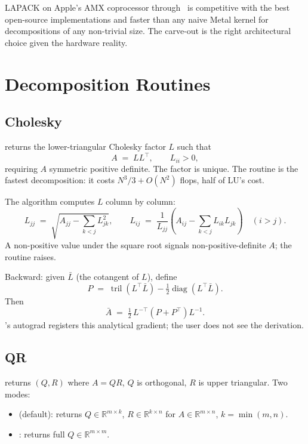 LAPACK on Apple's AMX coprocessor through \Accelerate\ is
competitive with the best open-source implementations and faster
than any naive Metal kernel for decompositions of any non-trivial
size. The carve-out is the right architectural choice given the
hardware reality.

\section{Decomposition Routines}
\label{sec:linalg:decompositions}

\subsection{Cholesky}
\label{ssec:linalg:cholesky}

 returns the lower-triangular Cholesky factor
$L$ such that
\[
A \;=\; L L^\top, \qquad L_{ii} > 0,
\]
requiring $A$ symmetric positive definite. The factor is unique.
The routine is the fastest decomposition: it costs
$N^3/3 + O(N^2)$ flops, half of LU's cost.

The algorithm computes $L$ column by column:
\[
L_{jj} \;=\; \sqrt{A_{jj} - \sum_{k<j} L_{jk}^2},
\qquad
L_{ij} \;=\; \frac{1}{L_{jj}}\!\left(A_{ij} - \sum_{k<j} L_{ik} L_{jk}\right)
\quad (i > j).
\]
A non-positive value under the square root signals
non-positive-definite $A$; the routine raises.

Backward: given $\bar L$ (the cotangent of $L$), define
\[
P \;=\; \operatorname{tril}(L^\top \bar L) - \tfrac{1}{2}\operatorname{diag}(L^\top \bar L).
\]
Then
\[
\bar A \;=\; \tfrac{1}{2}\, L^{-\top} (P + P^\top) L^{-1}.
\]
\Lucid's autograd registers this analytical gradient; the user
does not see the derivation.

\subsection{QR}
\label{ssec:linalg:qr}

 returns $(Q, R)$ where $A = QR$, $Q$ is orthogonal,
$R$ is upper triangular. Two modes:

\begin{itemize}
  \item {} (default): returns
    $Q \in \mathbb{R}^{m \times k}$, $R \in \mathbb{R}^{k \times
    n}$ for $A \in \mathbb{R}^{m \times n}$, $k = \min(m, n)$.
  \item {}: returns full $Q \in
    \mathbb{R}^{m \times m}$.
\end{itemize}

